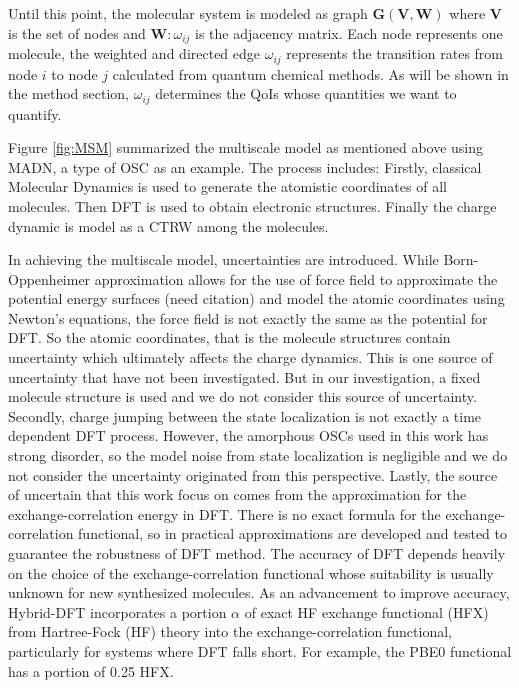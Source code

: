 \documentclass[%
 reprint,
 amsmath,amssymb,
 aps,
]{revtex4-2}
\begin{document}
Until this point, the molecular system is modeled as graph $\mathbf{G}(\mathbf{V}, \mathbf{W})$ where $\mathbf{V}$ is the set of nodes and $\mathbf{W}: \omega_{ij}$ is the adjacency matrix. Each node represents one molecule, the weighted and directed edge $\omega_{ij}$ represents the transition rates from node $i$ to node $j$ calculated from quantum chemical methods. 
As will be shown in the method section, $\omega_{ij}$ determines the QoIs whose quantities we want to quantify.

Figure \ref{fig:MSM} summarized the multiscale model as mentioned above using MADN, a type of OSC as an example. 
The process includes: Firstly, classical Molecular Dynamics is used to generate the atomistic coordinates of all molecules. Then DFT is used to obtain electronic structures. Finally the charge dynamic is model as a CTRW among the molecules.


In achieving the multiscale model, uncertainties are introduced. 
While Born-Oppenheimer approximation allows for the use of force field to approximate the potential energy surfaces (need citation) and model the atomic coordinates using Newton’s equations, the force field is not exactly the same as the potential for DFT. 
So the atomic coordinates, that is the molecule structures contain uncertainty which ultimately affects the charge dynamics. 
This is one source of uncertainty that have not been investigated. But in our investigation, a fixed molecule structure is used and we do not consider this source of uncertainty. 
Secondly, charge jumping between the state localization is not exactly a time dependent DFT process. 
However, the amorphous OSCs used in this work has strong disorder, so the model noise from state localization is negligible and we do not consider the uncertainty originated from this perspective.
Lastly, the source of uncertain that this work focus on comes from the approximation for the exchange-correlation energy in DFT. 
There is no exact formula for the exchange-correlation functional, so in practical approximations are developed and tested to guarantee the robustness of DFT method. 
The accuracy of DFT depends heavily on the choice of the exchange-correlation functional whose suitability is usually unknown for new synthesized molecules. 
As an advancement to improve accuracy, Hybrid-DFT incorporates a portion $\alpha$ of exact HF exchange functional (HFX) from Hartree-Fock (HF) theory into the exchange-correlation functional, particularly for systems where DFT falls short. For example, the PBE0 functional has a portion of 0.25 HFX.
\end{document}
